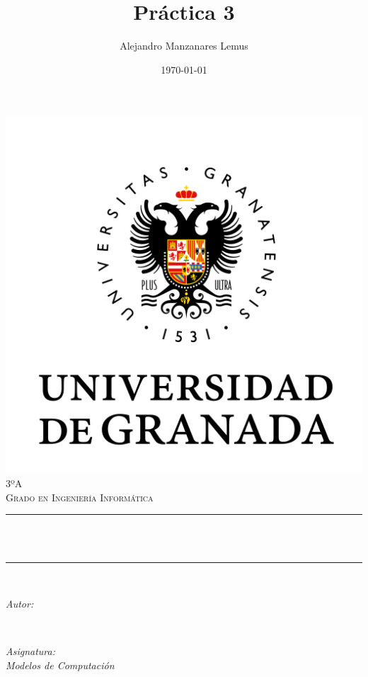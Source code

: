 \documentclass[12pt, spanish]{article}
\title{Práctica 3}
\author{Alejandro Manzanares Lemus }
\date{\today}
\makeatletter
\let\thetitle\@title
\let\theauthor\@author
\let\thedate\@date
\makeatother
\begin{document}
\begin{titlepage}
    \centering
    \vspace*{0.5 cm}
    \includegraphics[scale = 0.50]{UGR.png}\\[1.0 cm]
    \textsc{\large 3ºA}\\[0.5 cm]            
    \textsc{\large Grado en Ingeniería Informática}\\[0.5 cm]              
    \rule{\linewidth}{0.2 mm} \\[0.4 cm]
    { \huge \bfseries \thetitle}\\
    \rule{\linewidth}{0.2 mm} \\[1.5 cm]
    
    \begin{minipage}{0.4\textwidth}
        \begin{flushleft} \large
            \emph{Autor:}\\
            \theauthor
            \end{flushleft}
            \end{minipage}~
            \begin{minipage}{0.4\textwidth}
            \begin{flushright} \large
            \emph{Asignatura: \\
            Modelos de Computación}                   
        \end{flushright}
    \end{minipage}\\[1 cm]
  	
    {\large \thedate}\\[1 cm]
 	
    \vfill
    
\end{titlepage}
\pagebreak
\end{document}
